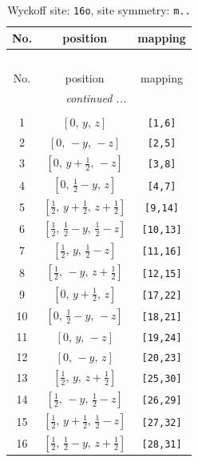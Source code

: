 \documentclass[fleqn,8pt]{jsarticle}
\begin{document}
\renewcommand{\arraystretch}{1.2}
\begin{longtable}{ccc}
\caption{Wyckoff site: {\tt 16o}, site symmetry: {\tt m..}}
 \\
 \hline \hline
No. & position & mapping \\ \hline \endfirsthead

\multicolumn{2}{l}{\tablename\ \thetable{}} \\
 \hline \hline
No. & position & mapping \\ \hline \endhead

 \hline \hline
\multicolumn{2}{r}{\footnotesize\it continued ...} \\ \endfoot

 \hline \hline
\multicolumn{2}{r}{} \\ \endlastfoot

1 & $\left[ 0,\, y,\, z \right]$ & {\tt [1,6]} \\ \hline
2 & $\left[ 0,\, - y,\, - z \right]$ & {\tt [2,5]} \\ \hline
3 & $\left[ 0,\, y + \frac{1}{2},\, - z \right]$ & {\tt [3,8]} \\ \hline
4 & $\left[ 0,\, \frac{1}{2} - y,\, z \right]$ & {\tt [4,7]} \\ \hline
5 & $\left[ \frac{1}{2},\, y + \frac{1}{2},\, z + \frac{1}{2} \right]$ & {\tt [9,14]} \\ \hline
6 & $\left[ \frac{1}{2},\, \frac{1}{2} - y,\, \frac{1}{2} - z \right]$ & {\tt [10,13]} \\ \hline
7 & $\left[ \frac{1}{2},\, y,\, \frac{1}{2} - z \right]$ & {\tt [11,16]} \\ \hline
8 & $\left[ \frac{1}{2},\, - y,\, z + \frac{1}{2} \right]$ & {\tt [12,15]} \\ \hline
9 & $\left[ 0,\, y + \frac{1}{2},\, z \right]$ & {\tt [17,22]} \\ \hline
10 & $\left[ 0,\, \frac{1}{2} - y,\, - z \right]$ & {\tt [18,21]} \\ \hline
11 & $\left[ 0,\, y,\, - z \right]$ & {\tt [19,24]} \\ \hline
12 & $\left[ 0,\, - y,\, z \right]$ & {\tt [20,23]} \\ \hline
13 & $\left[ \frac{1}{2},\, y,\, z + \frac{1}{2} \right]$ & {\tt [25,30]} \\ \hline
14 & $\left[ \frac{1}{2},\, - y,\, \frac{1}{2} - z \right]$ & {\tt [26,29]} \\ \hline
15 & $\left[ \frac{1}{2},\, y + \frac{1}{2},\, \frac{1}{2} - z \right]$ & {\tt [27,32]} \\ \hline
16 & $\left[ \frac{1}{2},\, \frac{1}{2} - y,\, z + \frac{1}{2} \right]$ & {\tt [28,31]} \\
\end{longtable}
\end{document}
